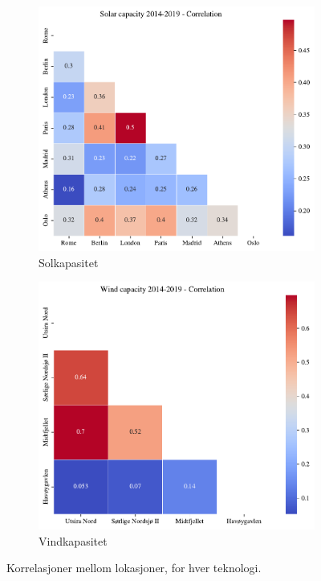 \documentclass{article}
\begin{document}
\begin{figure}[h]
\centering
\begin{subfigure}{.5\textwidth}
    \centering
    \includegraphics[width=\linewidth]{figures/Solar/Solar capacity 2014-2019 - Correlation.pdf}
    \caption{Solkapasitet}
    \label{fig:corr_sol}
\end{subfigure}%
\begin{subfigure}{.5\textwidth}
    \centering
    \includegraphics[width=\linewidth]{figures/Wind/Wind capacity 2014-2019 - Correlation.pdf}
    \caption{Vindkapasitet}
    \label{fig:corr_vind}
\end{subfigure}
\caption{Korrelasjoner mellom lokasjoner, for hver teknologi.}
\label{fig:correlation}
\end{figure}
\end{document}
